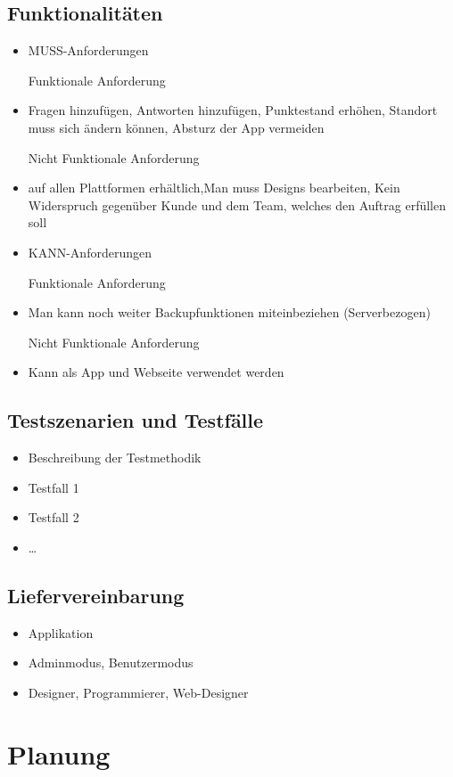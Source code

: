 \subsection{Funktionalitäten}
\begin{itemize}
	\item MUSS-Anforderungen

		
		Funktionale Anforderung
		\item Fragen hinzufügen, Antworten hinzufügen, Punktestand erhöhen, Standort muss sich ändern können, Absturz der App vermeiden
		
		Nicht Funktionale Anforderung
		\item auf allen Plattformen erhältlich,Man muss Designs bearbeiten, Kein Widerspruch gegenüber Kunde und dem Team, welches den Auftrag erfüllen soll
		
	
	\item KANN-Anforderungen
	
		
		Funktionale Anforderung
		\item Man kann noch weiter Backupfunktionen miteinbeziehen (Serverbezogen)
		
		Nicht Funktionale Anforderung
		\item Kann als App und Webseite verwendet werden 
		

\end{itemize}
\subsection{Testszenarien und Testfälle}
\begin{itemize}
	\item Beschreibung der Testmethodik
	\item Testfall 1
	\item Testfall 2
	\item \ldots
\end{itemize}
\subsection{Liefervereinbarung}
\begin{itemize}
	\item Applikation
	\item Adminmodus, Benutzermodus
	\item Designer, Programmierer, Web-Designer
\end{itemize}
\section{Planung}
